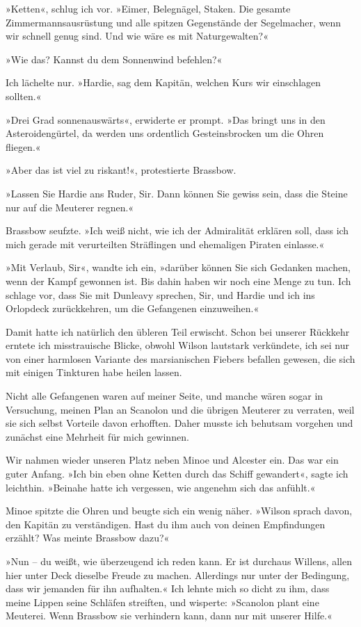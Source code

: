 »Ketten«, schlug ich vor. »Eimer, Belegnägel, Staken. Die gesamte
Zimmermannsausrüstung und alle spitzen Gegenstände der Segelmacher,
wenn wir schnell genug sind. Und wie wäre es mit Naturgewalten?«

»Wie das? Kannst du dem Sonnenwind befehlen?«

Ich lächelte nur. »Hardie, sag dem Kapitän, welchen Kurs wir
einschlagen sollten.«

»Drei Grad sonnenauswärts«, erwiderte er prompt. »Das bringt uns in
den Asteroidengürtel, da werden uns ordentlich Gesteinsbrocken um
die Ohren fliegen.«

»Aber das ist viel zu riskant!«, protestierte Brassbow.

»Lassen Sie Hardie ans Ruder, Sir. Dann können Sie gewiss sein,
dass die Steine nur auf die Meuterer regnen.«

Brassbow seufzte. »Ich weiß nicht, wie ich der Admiralität erklären
soll, dass ich mich gerade mit verurteilten Sträflingen und
ehemaligen Piraten einlasse.«

»Mit Verlaub, Sir«, wandte ich ein, »darüber können Sie sich
Gedanken machen, wenn der Kampf gewonnen ist. Bis dahin haben wir
noch eine Menge zu tun. Ich schlage vor, dass Sie mit Dunleavy
sprechen, Sir, und Hardie und ich ins Orlopdeck zurückkehren, um
die Gefangenen einzuweihen.«

Damit hatte ich natürlich den übleren Teil erwischt. Schon bei
unserer Rückkehr erntete ich misstrauische Blicke, obwohl Wilson
lautstark verkündete, ich sei nur von einer harmlosen Variante des
marsianischen Fiebers befallen gewesen, die sich mit einigen
Tinkturen habe heilen lassen.

Nicht alle Gefangenen waren auf meiner Seite, und manche wären
sogar in Versuchung, meinen Plan an Scanolon und die übrigen
Meuterer zu verraten, weil sie sich selbst Vorteile davon
erhofften. Daher musste ich behutsam vorgehen und zunächst eine
Mehrheit für mich gewinnen.

Wir nahmen wieder unseren Platz neben Minoe und Alcester ein. Das
war ein guter Anfang. »Ich bin eben ohne Ketten durch das Schiff
gewandert«, sagte ich leichthin. »Beinahe hatte ich vergessen, wie
angenehm sich das anfühlt.«

Minoe spitzte die Ohren und beugte sich ein wenig näher. »Wilson
sprach davon, den Kapitän zu verständigen. Hast du ihm auch von
deinen Empfindungen erzählt? Was meinte Brassbow dazu?«

»Nun – du weißt, wie überzeugend ich reden kann. Er ist durchaus
Willens, allen hier unter Deck dieselbe Freude zu machen.
Allerdings nur unter der Bedingung, dass wir jemanden für ihn
aufhalten.« Ich lehnte mich so dicht zu ihm, dass meine Lippen
seine Schläfen streiften, und wisperte: »Scanolon plant eine
Meuterei. Wenn Brassbow sie verhindern kann, dann nur mit unserer
Hilfe.«

